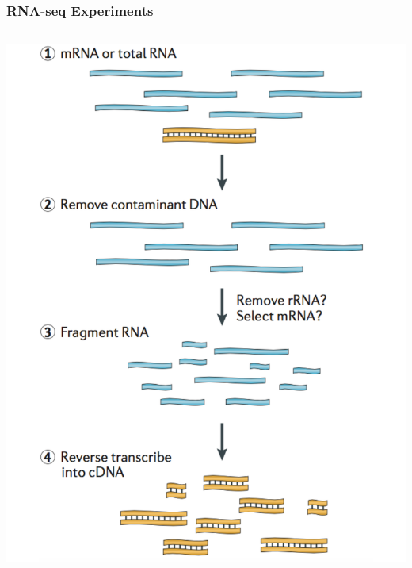 \frame
{
	\frametitle{RNA-seq Experiments}

	\vspace{-0.05cm}
	\begin{columns}[c]
	 \includegraphics[width=\textwidth]{figures/seq1.pdf}

\end{columns}}
